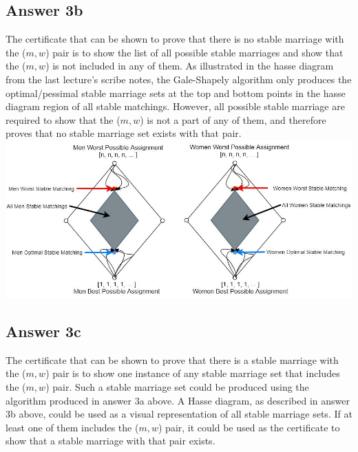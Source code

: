 \documentclass[twoside]{article}
\begin{document}
\subsection{Answer 3b}

The certificate that can be shown to prove that there is no stable marriage with the ($m, w$) pair is to show the list of all possible stable marriages and show that the ($m, w$) is not included in any of them. As illustrated in the hasse diagram from the last lecture's scribe notes, the Gale-Shapely algorithm only produces the optimal/pessimal stable marriage sets at the top and bottom points in the hasse diagram region of all stable matchings. However, all possible stable marriage are required to show that the ($m, w$) is not a part of any of them, and therefore proves that no stable marriage set exists with that pair.\\

\includegraphics[width=\textwidth]{Hasse_Diagram_All_Possible_Stable_Matching}

\subsection{Answer 3c}

The certificate that can be shown to prove that there is a stable marriage with the ($m, w$) pair is to show one instance of any stable marriage set that includes the ($m, w$) pair. Such a stable marriage set could be produced using the algorithm produced in answer 3a above. A Hasse diagram, as described in answer 3b above, could be used as a visual representation of all stable marriage sets. If at least one of them includes the ($m, w$) pair, it could be used as the certificate to show that a stable marriage with that pair exists. \\
\end{document}
